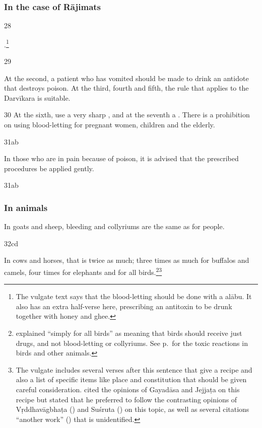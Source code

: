 \begin{translation}
\subsubsection{In the case of Rājimats}

\item[28]

.\footnote{The vulgate text says that the blood-letting should be
    done with a \gls{alābu}.  It also has an extra half-verse here,
    prescribing an antitoxin to be drunk together with honey and ghee.}

\item [29]

At the second, a patient who has vomited should be made to drink an antidote 
that destroys poison.   At the third, fourth and fifth, the rule that applies to the 
Darvīkara is suitable. 


\item [30] At the sixth, use a very sharp , and at
the seventh a .  There is a prohibition
    on using blood-letting for pregnant women, children and the elderly.

\item [31ab]

In those who are in pain because of poison, it is advised that the prescribed 
procedures be applied gently. 

\item [31ab]

\subsubsection{In animals}
In goats and sheep, bleeding and collyriums are the same as for people. 

\item [32cd]

In cows and horses, that is twice as much; three times as much for buffalos and 
camels, four times for elephants and  for all birds.\footnote{ 
 explained “simply for all birds” as meaning that birds 
should receive just drugs, and not blood-letting or collyriums.  See 
p.\,\pageref{bird-pulse} for the toxic reactions in birds and other 
animals.}\footnote{The vulgate includes 
several verses after this
    sentence that give a recipe and also a list of specific items like place
    and constitution that should be given careful consideration.
     cited the opinions of Gayadāsa and Jejjaṭa on this
    recipe but stated that he preferred to follow the contrasting opinions of
    Vṛddhavāgbhaṭa () and Suśruta
    () on this topic, as well as several citations
    “another work” () that is unidentified.}



\end{translation}
